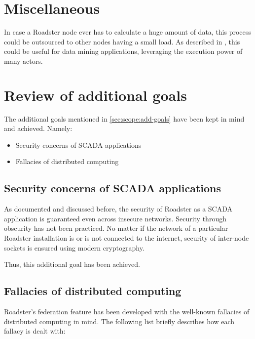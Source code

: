 \section{Miscellaneous}
In case a Roadster node ever has to calculate a huge amount of data, this
process could be outsourced to other nodes having a small load. As described in
\cite{ieee:data-mining}, this could be useful for data mining applications,
leveraging the execution power of many actors.


\section{Review of additional goals}
The additional goals mentioned in \autoref{sec:scope:add-goals} have been kept
in mind and achieved. Namely:
\begin{itemize}
	\item Security concerns of SCADA applications
	\item Fallacies of distributed computing
\end{itemize}

\subsection{Security concerns of SCADA applications}
As documented and discussed before, the security of Roadster as a SCADA
application is guaranteed even across insecure networks. Security through
obscurity has not been practiced. No matter if the network of a particular
Roadster installation is or is not connected to the internet, security of
inter-node sockets is ensured using modern cryptography.

Thus, this additional goal has been achieved.

\subsection{Fallacies of distributed computing}
Roadster's federation feature has been developed with the well-known fallacies
of distributed computing in mind. The following list briefly describes how each
fallacy is dealt with:

